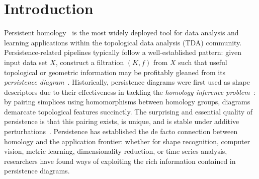 \documentclass[10pt]{article}
\numberwithin{equation}{section}
\newcommand{\+}{%
	\raisebox{0.18ex}{\scaleobj{0.55}{+}}
}
\theoremstyle{definition}
\theoremstyle{definition}
\begin{document}
\section{Introduction}\label{sec:intro}
Persistent homology~\cite{} is the most widely deployed tool for data analysis and learning applications within the topological data analysis (TDA) community. 
Persistence-related pipelines typically follow a well-established pattern: given input data set $X$, construct a filtration $(K, f)$ from $X$ such that useful topological or geometric information may be profitably gleaned from its \emph{persistence diagram}~\cite{}.
Historically, persistence diagrams were first used as shape descriptors due to their effectiveness in tackling the \emph{homology inference problem}~\cite{}: by pairing simplices using homomorphisms between homology groups, diagrams demarcate topological features succinctly.
The surprising and essential quality of persistence is that this pairing exists, is unique, and is stable under additive perturbations~\cite{cohen2005stability}.
Persistence has established the de facto connection between homology and the application frontier: whether for shape recognition, computer vision, metric learning, dimensionality reduction, or time series analysis, researchers have found ways of exploiting the rich information contained in persistence diagrams.
\end{document}
